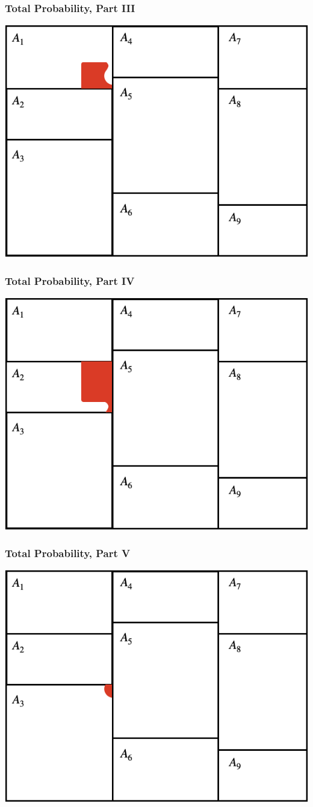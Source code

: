 \documentclass[12pt, block=fill]{beamer}
\begin{document}
\begin{frame}
  \frametitle{Total Probability, Part III}
  \begin{center}
    \includegraphics[width=0.75\linewidth]{./figures/total_probability_1}
  \end{center} 
\end{frame}

\begin{frame}
  \frametitle{Total Probability, Part IV}
  \begin{center}
    \includegraphics[width=0.75\linewidth]{./figures/total_probability_2}
  \end{center} 
\end{frame}

\begin{frame}
  \frametitle{Total Probability, Part V}
  \begin{center}
    \includegraphics[width=0.75\linewidth]{./figures/total_probability_3}
  \end{center} 
\end{frame}
\end{document}
